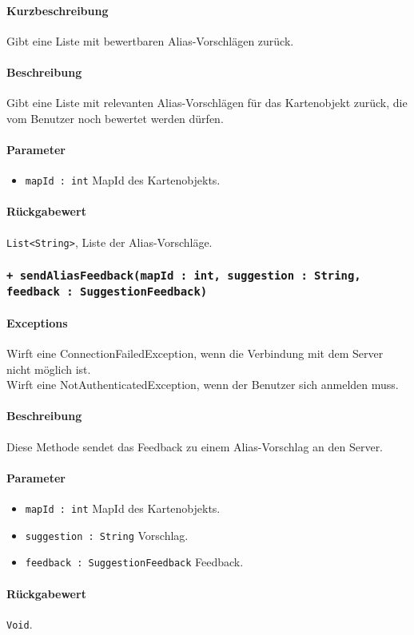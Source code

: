 \paragraph*{Kurzbeschreibung}
Gibt eine Liste mit bewertbaren Alias-Vorschlägen zurück.
\paragraph*{Beschreibung}
Gibt eine Liste mit relevanten Alias-Vorschlägen für das Kartenobjekt zurück, 
die vom Benutzer noch bewertet werden dürfen.
\paragraph*{Parameter}
\begin{itemize}
    \item \texttt{mapId : int} MapId des Kartenobjekts.
\end{itemize}
\paragraph*{Rückgabewert}
\texttt{List<String>}, Liste der Alias-Vorschläge.

\subsubsection*{\texttt{+ sendAliasFeedback(mapId : int, suggestion : String, feedback : SuggestionFeedback)}}\label{App_AddAlias_GlobalAliasManager_sentAliasFeedback}%
\paragraph*{Exceptions}
Wirft eine ConnectionFailedException, wenn die Verbindung mit dem Server nicht möglich ist.\\
Wirft eine NotAuthenticatedException, wenn der Benutzer sich anmelden muss.
\paragraph*{Beschreibung}
Diese Methode sendet das Feedback zu einem Alias-Vorschlag an den Server.
\paragraph*{Parameter}
\begin{itemize}
    \item \texttt{mapId : int} MapId des Kartenobjekts.
    \item \texttt{suggestion : String} Vorschlag. 
    \item \texttt{feedback : SuggestionFeedback} Feedback.
\end{itemize}
\paragraph*{Rückgabewert}
\texttt{Void}.